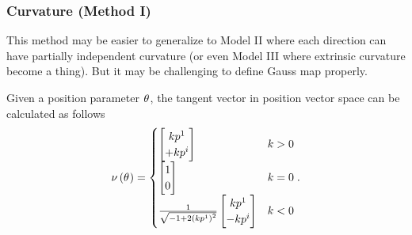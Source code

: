 \documentclass[stu, babel, american, biblatex, a4paper, leqno, draftall]{apa7}
\begin{document}
\subsubsection{Curvature (Method I)}
This method may be easier to generalize to
Model II where each direction can have partially independent curvature
(or even Model III where extrinsic curvature become a thing).
But it may be challenging to define Gauss map properly.
\begin{lemma}\label{Model:NormalVector}
    Given a position parameter $\tensor{\theta}{}$,
    the tangent vector in position vector space can be calculated as follows
    \begin{equation*}
        \nu\left(\tensor{\theta}{}\right)
        =
        \begin{cases}
            \begin{bmatrix}
                k\tensor{p}{^1}  \\
                +k\tensor{p}{^i} \\
            \end{bmatrix} & k>0 \\
            \begin{bmatrix}
                1 \\
                0 \\
            \end{bmatrix} & k=0 \\
            \frac{1}{\sqrt{-1+2\left(k\tensor{p}{^1}\right)^2}}
            \begin{bmatrix}
                k\tensor{p}{^1}  \\
                -k\tensor{p}{^i} \\
            \end{bmatrix} & k<0
        \end{cases}
        \text{.}
    \end{equation*}
\end{lemma}
\end{document}
